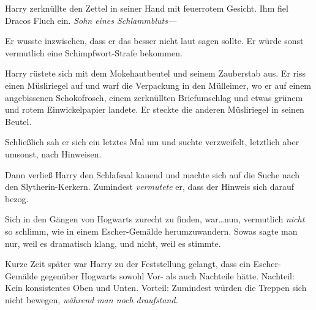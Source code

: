 Harry zerknüllte den Zettel in seiner Hand mit feuerrotem Gesicht. Ihm fiel Dracos Fluch ein. \emph{Sohn eines Schlammbluts—}

Er wusste inzwischen, dass er das besser nicht laut sagen sollte. Er würde sonst vermutlich eine Schimpfwort-Strafe bekommen.

Harry rüstete sich mit dem Mokehautbeutel und seinem Zauberstab aus. Er riss einen Müsliriegel auf und warf die Verpackung in den Mülleimer, wo er auf einem angebissenen Schokofrosch, einem zerknüllten Briefumschlag und etwas grünem und rotem Einwickelpapier landete. Er steckte die anderen Müsliriegel in seinen Beutel.

Schließlich sah er sich ein letztes Mal um und suchte verzweifelt, letztlich aber umsonst, nach Hinweisen.

Dann verließ Harry den Schlafsaal kauend und machte sich auf die Suche nach den Slytherin-Kerkern. Zumindest \emph{vermutete} er, dass der Hinweis sich darauf bezog.

Sich in den Gängen von Hogwarts zurecht zu finden, war…nun, vermutlich \emph{nicht} so schlimm, wie in einem Escher-Gemälde herumzuwandern. Sowas sagte man nur, weil es dramatisch klang, und nicht, weil es stimmte.

Kurze Zeit später war Harry zu der Feststellung gelangt, dass ein Escher-Gemälde gegenüber Hogwarts sowohl Vor- als auch Nachteile hätte. Nachteil: Kein konsistentes Oben und Unten. Vorteil: Zumindest würden die Treppen sich nicht bewegen, \emph{während man noch draufstand.}

